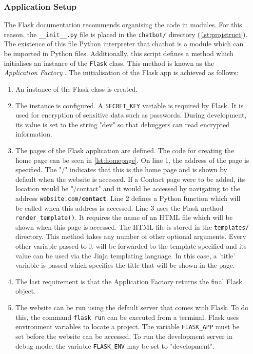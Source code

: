 \documentclass[12pt,a4paper]{article}
\begin{document}
\subsubsection{Application Setup}
The Flask documentation recommends organising the code in modules. For this reason, the \texttt{\_\_init\_\_.py} file is placed in the \texttt{chatbot/} directory (\cref{lst:projstruct}). The existence of this file Python interpreter that chatbot is a module which can be imported in Python files. Additionally, this script defines a method which initialises an instance of the \texttt{Flask} class. This method is known as the \textit{Application Factory} \citep{Flask:online}. The initialisation of the Flask app is achieved as follows:

\begin{enumerate}
    \item An instance of the Flask class is created.
    \item The instance is configured. A \texttt{SECRET\_KEY} variable is required by Flask. It is used for encryption of sensitive data such as passwords. During development, its value is set to the string "dev" so that debuggers can read encrypted information.
    \item The pages of the Flask application are defined. The code for creating the home page can be seen in \cref{lst:homepage}. On line 1, the address of the page is specified. The "/" indicates that this is the home page and is shown by default when the website is accessed. If a Contact page were to be added, its location would be "/contact" and it would be accessed by navigating to the address \texttt{website.com/\textbf{contact}}. Line 2 defines a Python function which will be called when this address is accessed. Line 3 uses the Flask method \texttt{render\_template()}. It requires the name of an HTML file which will be shown when this page is accessed. The HTML file is stored in the \texttt{templates/} directory. This method takes any number of other optional arguments. Every other variable passed to it will be forwarded to the template specified and its value can be used via the Jinja templating language. In this case, a 'title' variable is passed which specifies the title that will be shown in the page.
    \item The last requirement is that the Application Factory returns the final Flask object.
    \item The website can be run using the default server that comes with Flask. To do this, the command \texttt{flask run} can be executed from a terminal. Flask uses environment variables to locate a project. The variable \texttt{FLASK\_APP} must be set before the website can be accessed. To run the development server in debug mode, the variable \texttt{FLASK\_ENV} may be set to "development". 
\end{enumerate}
\end{document}
